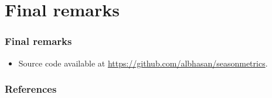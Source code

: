 \documentclass[aspectratio=169]{beamer}
\begin{document}
\section{Final remarks}

\begin{frame}
    \frametitle{Final remarks}
    \begin{itemize}
        \item Source code available at
                \url{https://github.com/albhasan/seasonmetrics}.
    \end{itemize}
\end{frame}

\begin{frame}[allowframebreaks]
    \frametitle{References}
    
    
\end{frame}
\end{document}
